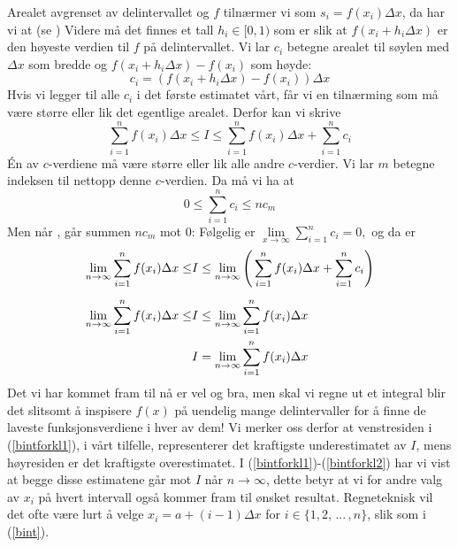 Arealet avgrenset av delintervallet og $ f $ tilnærmer vi som $s_i= f(x_i)\Delta x $, da har vi at (se )
Videre må det finnes et tall $ {h_i\in [0, 1)} $ som er slik at $ f(x_i+h_i\Delta x) $ er den høyeste verdien til $ f $ på delintervallet. Vi lar $ c_i $ betegne arealet til søylen med $ \Delta x $ som bredde og  $ f(x_i+h_i\Delta x)-f(x_i)$ som høyde:
\[ c_i = (f(x_i+h_i\Delta x)-f(x_i))\Delta x \]
Hvis vi legger til alle $ c_i $ i det første estimatet vårt, får vi en tilnærming som må være større eller lik det egentlige arealet. Derfor kan vi skrive
\[\sum\limits_{i=1}^{n} f(x_i)\Delta x \leq I \leq \sum\limits_{i=1}^{n} f(x_i)\Delta x+ \sum\limits_{i=1}^{n} c_i \]
Én av $ c $-verdiene må være større eller lik alle andre $ c $-verdier. Vi lar $ m $ betegne indeksen til nettopp denne $ c $-verdien. Da må vi ha at
\[0\leq \sum\limits_{i=1}^{n} c_i \leq nc_{m} \]  
Men når , går summen $ nc_m $ mot 0:
\newpage
Følgelig er $ \lim\limits_{x\to\infty} \sum\limits_{i=1}^{n} c_i =0,$ og da er
\begin{align}
	\lim\limits_{n\to\infty}\sum\limits_{i=1}^{n} f(x_i)\Delta x \leq &I \leq \lim\limits_{n\to\infty}\left(\,\sum\limits_{i=1}^{n} f(x_i)\Delta x+ \sum\limits_{i=1}^{n} c_i\right) \label{bintforkl1} \br
	\lim\limits_{n\to\infty}\sum\limits_{i=1}^{n} f(x_i)\Delta x \leq &I\leq \lim\limits_{n\to\infty}\sum\limits_{i=1}^{n} f(x_i)\Delta x \\
	&I= \lim\limits_{n\to\infty}\sum\limits_{i=1}^{n} f(x_i)\Delta x	\label{bintforkl2}
\end{align}
Det vi har kommet fram til nå er vel og bra, men skal vi regne ut et integral blir det slitsomt å inspisere $ f(x) $ på uendelig mange delintervaller for å finne de laveste funksjonsverdiene i hver av dem! Vi merker oss derfor at venstresiden i (\ref{bintforkl1}), i vårt tilfelle, representerer det kraftigste underestimatet av $ I $, mens høyresiden er det kraftigste overestimatet. I (\ref{bintforkl1})-(\ref{bintforkl2}) har vi vist at begge disse estimatene går mot $ I $ når $ {n\to\infty} $, dette betyr at vi for andre valg av $ x_i $ på hvert intervall også kommer fram til ønsket resultat. Regneteknisk vil det ofte være lurt å velge $ x_i=a+(i-1)\Delta x $ for $ {i\in\lbrace 1, 2,\,...\,, n\rbrace} $, slik som i (\ref{bint}).\vsk

